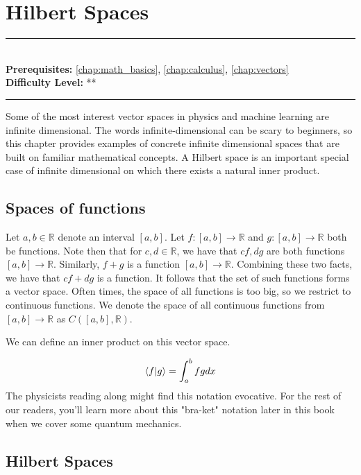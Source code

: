\documentclass[book.tex]{subfiles}
\begin{document}
\chapter{Hilbert Spaces}
\label{chap:hilbert}
\noindent\rule{11cm}{0.4pt} \\
\textbf{Prerequisites:} \autoref{chap:math_basics}, \autoref{chap:calculus}, \autoref{chap:vectors} \\
\textbf{Difficulty Level:} ** \\
\noindent\rule{11cm}{0.4pt}
\vspace{5mm}


Some of the most interest vector spaces in physics and machine learning are infinite dimensional. The words infinite-dimensional can be scary to beginners, so this chapter provides examples of concrete infinite dimensional spaces that are built on familiar mathematical concepts. A Hilbert space is an important special case of infinite dimensional on which there exists a natural inner product.

\section{Spaces of functions}
Let $a, b \in \mathbb{R}$ denote an interval $[a, b]$.
Let $f: [a, b] \to \mathbb{R}$ and $g: [a, b] \to \mathbb{R}$ both be functions. Note then that for $c, d\in \mathbb{R}$, we have that $cf, dg$ are both functions $[a, b] \to \mathbb{R}$. Similarly, $f+g$ is a function $[a, b] \to \mathbb{R}$. Combining these two facts, we have that $cf + dg$ is a function. It follows that the set of such functions forms a vector space. Often times, the space of all functions is too big, so we restrict to continuous functions. We denote the space of all continuous functions from $[a, b]\to \mathbb{R}$ as $C([a, b],\mathbb{R})$.

We can define an inner product on this vector space.

\begin{equation}
\braket{f|g} = \int_a^b f g dx
\end{equation}
The physicists reading along might find this notation evocative. For the rest of our readers, you'll learn more about this "bra-ket" notation later in this book when we cover some quantum mechanics.



\section{Hilbert Spaces}
\end{document}
